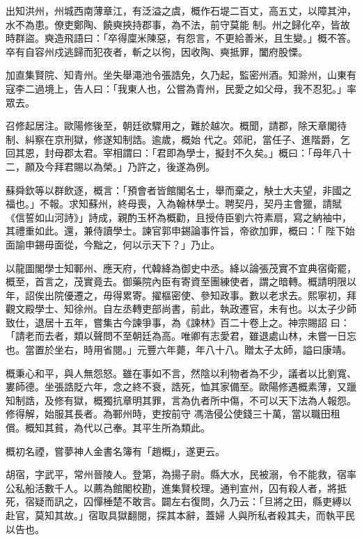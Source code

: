 \begin{pinyinscope}
 出知洪州，州城西南薄章江，有泛溢之虞，概作石堤二百丈，高五丈，以障其沖，水不為患。僚吏鄭陶、饒奭挾持郡事，為不法，前守莫能
 制。州之歸化卒，皆故時群盜。奭造飛語曰：「卒得廩米陳惡，有怨言，不更給善米，且生變。」概不答。卒有自容州戍逃歸而犯夜者，斬之以徇，因收陶、奭抵罪，闔府股慄。



 加直集賢院、知青州。坐失舉澠池令張誥免，久乃起，監密州酒。知滁州，山東有寇李二過境上，告人曰：「我東人也，公嘗為青州，民愛之如父母，我不忍犯。」率眾去。



 召修起居注。歐陽修後至，朝廷欲驟用之，難於越次。概聞，請郡，除天章閣待制、糾察在京刑獄，修遂知制誥。逾歲，概始
 代之。郊祀，當任子、進階爵，乞回其恩，封母郡太君。宰相謂曰：「君即為學士，擬封不久矣。」概曰：「母年八十二，願及今拜君賜以為榮。」乃許之，後遂為例。



 蘇舜欽等以群飲逐，概言：「預會者皆館閣名士，舉而棄之，觖士大夫望，非國之福也。」不報。求知蘇州，終母喪，入為翰林學士。聘契丹，契丹主會獵，請賦《信誓如山河詩》」詩成，親酌玉杯為概勸，且授侍臣劉六符素扇，寫之納袖中，其禮重如此。還，兼侍讀學士。諫官郭申錫論事忤旨，帝欲加罪，概曰：「
 陛下始面諭申錫毋面從，今黜之，何以示天下？」乃止。



 以龍圖閣學士知鄆州、應天府，代韓絳為御史中丞。絳以論張茂實不宜典宿衛罷，概至，首言之，茂實竟去。御藥院內臣有寄資至團練使者，謂之暗轉。概請明限以年，詔俟出院優遷之，毋得累寄。擢樞密使、參知政事。數以老求去。熙寧初，拜觀文殿學士、知徐州。自左丞轉吏部尚書，前此，執政遷官，未有也。以太子少師致仕，退居十五年，嘗集古今諫爭事，為《諫林》百二十卷上之。神宗賜詔
 曰：「請老而去者，類以聲問不至朝廷為高。唯卿有志愛君，雖退處山林，未嘗一日忘也。當置於坐右，時用省閱。」元豐六年薨，年八十八。贈太子太師，謚曰康靖。



 概秉心和平，與人無怨怒。雖在事如不言，然陰以利物者為不少，議者以比劉寬、婁師德。坐張誥貶六年，念之終不衰，誥死，恤其家備至。歐陽修遇概素薄，又躐知制誥，及修有獄，概獨抗章明其罪，言為仇者所中傷，不可以天下法為人報怨。修得解，始服其長者。為鄆州時，吏按前守
 馮浩侵公使錢三十萬，當以職田租償。概知其貧，為代以己奉。其平生所為類此。



 概初名禋，嘗夢神人金書名簿有「趙概」，遂更云。



 胡宿，字武平，常州晉陵人。登第，為揚子尉。縣大水，民被溺，令不能救，宿率公私船活數千人。以薦為館閣校勘，進集賢校理。通判宣州，囚有殺人者，將抵死，宿疑而訊之，囚憚棰楚不敢言。闢左右復問，久乃云：「旦將之田，縣吏縛以赴官，莫知其故。」宿取具獄翻閱，探其本辭，蓋婦
 人與所私者殺其夫，而執平民以告也。




\end{pinyinscope}
